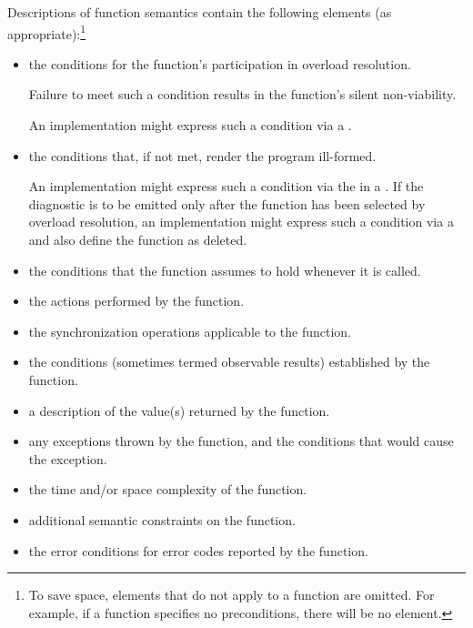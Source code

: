 \pnum
Descriptions of function semantics contain the following elements (as
appropriate):\footnote{To save space, elements that do not apply to a function are omitted.
For example, if a function specifies no
preconditions, there will be no \expects element.}

\begin{itemize}
\item
\constraints
the conditions for the function's participation
in overload resolution.
\begin{note}
Failure to meet such a condition results in the function's silent non-viability.
\end{note}
\begin{example}
An implementation might express such a condition
via a .
\end{example}

\item
\mandates
the conditions that, if not met, render the program ill-formed.
\begin{example}
An implementation might express such a condition
via the 
in a .
If the diagnostic is to be emitted only after the function
has been selected by overload resolution,
an implementation might express such a condition
via a 
and also define the function as deleted.
\end{example}

\item
\expects
the conditions
that the function assumes to hold whenever it is called.

\item
\effects
the actions performed by the function.

\item
\sync
the synchronization operations applicable to the function.

\item
\ensures
the conditions (sometimes termed observable results)
established by the function.

\item
\returns
a description of the value(s) returned by the function.

\item
\throws
any exceptions thrown by the function, and the conditions that would cause the exception.

\item
\complexity
the time and/or space complexity of the function.

\item
\remarks
additional semantic constraints on the function.

\item
\errors
the error conditions for error codes reported by the function.
\end{itemize}

